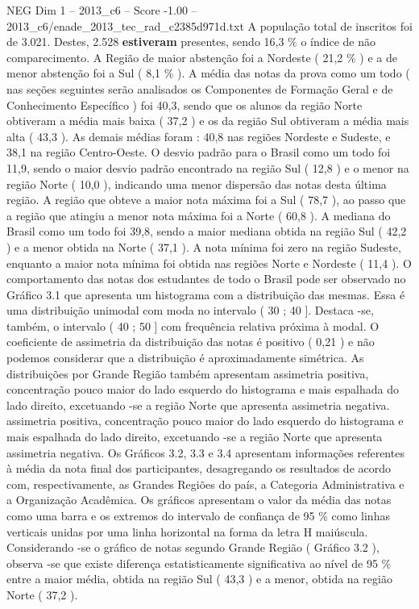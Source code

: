 \begin{textsample}{NEG Dim 1 – 2013\_c6 – Score -1.00 – 2013\_c6/enade\_2013\_tec\_rad\_c2385d971d.txt}
A população total de inscritos foi de 3.021.
Destes, 2.528 \textbf{estiveram} presentes, sendo 16,3 \% o índice de não comparecimento.
A Região de maior abstenção foi a Nordeste ( 21,2 \% ) e a de menor abstenção foi a Sul ( 8,1 \% ).
A média das notas da prova como um todo ( nas seções seguintes serão analisados os Componentes de Formação Geral e de Conhecimento Específico ) foi 40,3, sendo que os alunos da região Norte obtiveram a média mais baixa ( 37,2 ) e os da região Sul obtiveram a média mais alta ( 43,3 ).
As demais médias foram : 40,8 nas regiões Nordeste e Sudeste, e 38,1 na região Centro-Oeste.
O desvio padrão para o Brasil como um todo foi 11,9, sendo o maior desvio padrão encontrado na região Sul ( 12,8 ) e o menor na região Norte ( 10,0 ), indicando uma menor dispersão das notas desta última região.
A região que obteve a maior nota máxima foi a Sul ( 78,7 ), ao passo que a região que atingiu a menor nota máxima foi a Norte ( 60,8 ).
A mediana do Brasil como um todo foi 39,8, sendo a maior mediana obtida na região Sul ( 42,2 ) e a menor obtida na Norte ( 37,1 ).
A nota mínima foi zero na região Sudeste, enquanto a maior nota mínima foi obtida nas regiões Norte e Nordeste ( 11,4 ).
O comportamento das notas dos estudantes de todo o Brasil pode ser observado no Gráfico 3.1 que apresenta um histograma com a distribuição das mesmas.
Essa é uma distribuição unimodal com moda no intervalo ( 30 ; 40 ].
Destaca -se, também, o intervalo ( 40 ; 50 ] com frequência relativa próxima à modal.
O coeficiente de assimetria da distribuição das notas é positivo ( 0,21 ) e não podemos considerar que a distribuição é aproximadamente simétrica.
As distribuições por Grande Região também apresentam assimetria positiva, concentração pouco maior do lado esquerdo do histograma e mais espalhada do lado direito, excetuando -se a região Norte que apresenta assimetria negativa. assimetria positiva, concentração pouco maior do lado esquerdo do histograma e mais espalhada do lado direito, excetuando -se a região Norte que apresenta assimetria negativa.
Os Gráficos 3.2, 3.3 e 3.4 apresentam informações referentes à média da nota final dos participantes, desagregando os resultados de acordo com, respectivamente, as Grandes Regiões do país, a Categoria Administrativa e a Organização Acadêmica.
Os gráficos apresentam o valor da média das notas como uma barra e os extremos do intervalo de confiança de 95 \% como linhas verticais unidas por uma linha horizontal na forma da letra H maiúscula.
Considerando -se o gráfico de notas segundo Grande Região ( Gráfico 3.2 ), observa -se que existe diferença estatisticamente significativa ao nível de 95 \% entre a maior média, obtida na região Sul ( 43,3 ) e a menor, obtida na região Norte ( 37,2 ).

\end{textsample}
